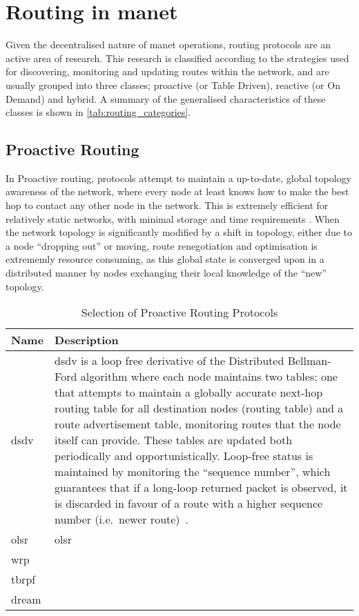\section{Routing in \acrlong{manet}}

Given the decentralised nature of \gls{manet} operations, routing protocols are an active area of research. 
This research is classified according to the strategies used for discovering, monitoring and updating routes within the network, and are usually grouped into three classes; proactive (or Table Driven), reactive (or On Demand) and hybrid.
A summary of the generalised characteristics of these classes is shown in \autoref{tab:routing_categories}.

\subsection{Proactive Routing}

In Proactive routing, protocols attempt to maintain a up-to-date, global topology awareness of the network, where every node at least knows how to make the best hop to contact any other node in the network.
This is extremely efficient for relatively static networks, with minimal storage and time requirements \cite{}.
When the network topology is significantly modified by a shift in topology, either due to a node ``dropping out'' or moving, route renegotiation and optimisation is extrememly resource consuming, as this global state is converged upon in a distributed manner by nodes exchanging their local knowledge of the ``new'' topology.

\begin{table}\centering
  \caption[Selection of Proactive Routing Protocols]{Selection of Proactive Routing Protocols}
  \label{tab:proactive_routing_protocols}
  \begin{tabularx}{\textwidth}{p{1.25cm}|X}\toprule
    Name & Description \\ \midrule
    \gls{dsdv} & \acrlong{dsdv} is a loop free derivative of the Distributed Bellman-Ford algorithm where each node maintains two tables; one that attempts to maintain a globally accurate next-hop routing table for all destination nodes (routing table) and a route advertisement table, monitoring routes that the node itself can provide. These tables are updated both periodically and opportunistically. Loop-free status is maintained by monitoring the ``sequence number'', which guarantees that if a long-loop returned packet is observed, it is discarded in favour of a route with a higher sequence number (i.e.\ newer route)~\cite{Perkins1994}.\\
    \gls{olsr} & \acrlong{olsr} \\
    \gls{wrp} & \\
    \gls{tbrpf} & \\
    \gls{dream} & \\
    \bottomrule
  \end{tabularx}
\end{table}



